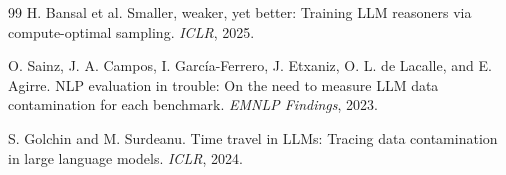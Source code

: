 \documentclass[sigconf,10pt]{acmart}
\newcommand{\TODO}[1]{\textcolor{red}{\textbf{[TODO: #1]}}}
\begin{document}
\begin{thebibliography}{99}
H. Bansal et al. Smaller, weaker, yet better: Training LLM reasoners via compute-optimal
sampling. \emph{ICLR}, 2025.

O. Sainz, J. A. Campos, I. García-Ferrero, J. Etxaniz, O. L. de Lacalle, and E. Agirre.
NLP evaluation in trouble: On the need to measure LLM data contamination for each benchmark.
\emph{EMNLP Findings}, 2023.

S. Golchin and M. Surdeanu. Time travel in LLMs: Tracing data contamination in large language
models. \emph{ICLR}, 2024.


\end{thebibliography}
\end{document}
